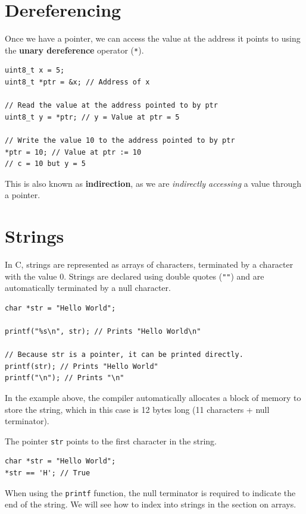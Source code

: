 \documentclass{report}
\begin{document}
\section{Dereferencing}
Once we have a pointer, we can access the value at the address it points to using the
\textbf{unary dereference} operator (\texttt{*}).
\begin{verbatim}
uint8_t x = 5;
uint8_t *ptr = &x; // Address of x

// Read the value at the address pointed to by ptr
uint8_t y = *ptr; // y = Value at ptr = 5

// Write the value 10 to the address pointed to by ptr
*ptr = 10; // Value at ptr := 10
// c = 10 but y = 5
\end{verbatim}
This is also known as \textbf{indirection}, as we are \textit{indirectly accessing} a value through a pointer.
\section{Strings}
In C, strings are represented as arrays of characters, terminated by a character with the value 0.
Strings are declared using double quotes (\texttt{""}) and are automatically terminated by a null character. %
\begin{verbatim}
char *str = "Hello World";

printf("%s\n", str); // Prints "Hello World\n"

// Because str is a pointer, it can be printed directly.
printf(str); // Prints "Hello World"
printf("\n"); // Prints "\n"
\end{verbatim}
In the example above, the compiler automatically allocates a block of memory to store the string,
which in this case is 12 bytes long (11 characters + null terminator).

The pointer \texttt{str} points to the first character in the string.
\begin{verbatim}
char *str = "Hello World";
*str == 'H'; // True
\end{verbatim}
When using the \texttt{printf} function, the null terminator is required to indicate the end of the string.
We will see how to index into strings in the section on arrays.
\end{document}
